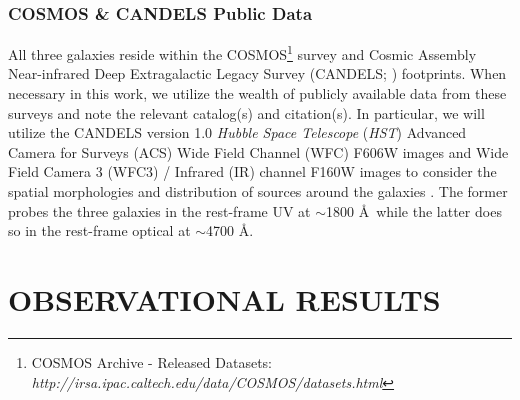 \documentclass{emulateapj}
\begin{document}
\subsubsection{COSMOS \& CANDELS Public Data}\label{subsubsec:COSMOS}
All three galaxies reside within the COSMOS\footnote[9]{COSMOS Archive - Released Datasets:\\ \textit{http://irsa.ipac.caltech.edu/data/COSMOS/datasets.html}} survey \citep{scoville2007} and Cosmic Assembly Near-infrared Deep Extragalactic Legacy Survey (CANDELS; \citealp{grogin2011}) footprints. When necessary in this work, we utilize the wealth of publicly available data from these surveys and note the relevant catalog(s) and citation(s). In particular, we will utilize the CANDELS version 1.0 \textit{Hubble Space Telescope} (\textit{HST}) Advanced Camera for Surveys (ACS) Wide Field Channel (WFC) F606W images and Wide Field Camera 3 (WFC3) / Infrared (IR) channel F160W images to consider the spatial morphologies and distribution of sources around the galaxies \citep{koekemoer2011}. The former probes the three galaxies in the rest-frame UV at $\sim$1800 \AA\ while the latter does so in the rest-frame optical at $\sim$4700 \AA.

\section{OBSERVATIONAL RESULTS}\label{sec:Results}
\end{document}
